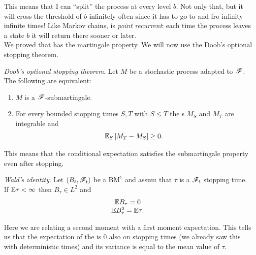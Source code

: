 \documentclass[12pt]{report}
\begin{document}
This means that I can ``split'' the process at every level $b$. Not only that, but it will cross the threshold of $b$ infinitely often since it has to go to and fro infinity infinite times! Like Markov chains, \bwm{} is \emph{point recurrent}: each time the process leaves a state $b$ it will return there sooner or later.\\
We proved that \bwm{} has the martingale property. We will now use the Doob's optional stopping theorem.
\begin{theorem}
	\emph{Doob's optional stopping theorem}. Let $M$ be a stochastic process adapted to $\mathscr{F}$. The following are equivalent:
	\begin{enumerate}
		\item $M$ is a $\mathscr{F}$-submartingale.
		\item For every bounded stopping times $S,T$ with $S\leq T$ the \rv s $M_{S}$ and $M_{T}$ are integrable and 
		\begin{equation*}
			\mathbb{E}_{S}\left[M_{T}-M_{S}\right]\geq0.
		\end{equation*}
	\end{enumerate}
\end{theorem}
	This means that the conditional expectation satisfies the submartingale property even after stopping.
	\begin{theorem}
		\emph{Wald's identity}. Let $(B_{t},\mathscr{F}_{t})$ be a $\mathrm{BM}^{1}$ and assum that $\tau$ is a $\mathscr{F}_{t}$ stopping time. If $\mathbb{E}\tau<\infty$ then $B_{\tau}\in L^{2}$ and
		\begin{equation*}
			\begin{array}{c}
				\mathbb{E} B_{\tau}=0\\
				\mathbb{E} B_{\tau}^{2}=\mathbb{E}\tau.
			\end{array}
		\end{equation*}
	\end{theorem}
	Here we are relating a second moment with a first moment expectation. This tells us that the expectation of the \bwm{} is 0 also on stopping times (we already saw this with deterministic times) and its variance is equal to the mean value of $\tau$.
\end{document}
